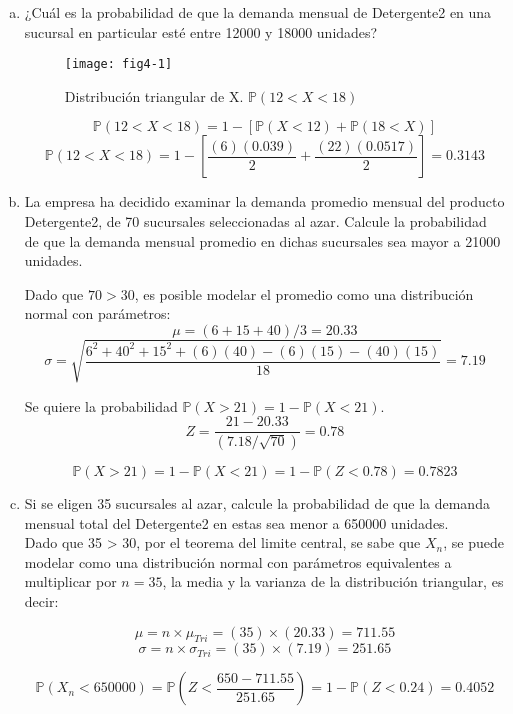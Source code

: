 \documentclass[../main.tex]{subfiles}
\begin{document}
\begin{enumerate}[(a)]

\item ¿Cuál es la probabilidad de que la demanda mensual de Detergente2
en una sucursal en particular esté entre 12000 y 18000 unidades?

\begin{figure}[h]
\centering
\texttt{[image: fig4-1]}
\label{fig:img1}
\caption{Distribución triangular de X. $\mathbb{P}(12 < X < 18)$}
\end{figure}

$$\mathbb{P}(12 < X < 18) = 1 - [\mathbb{P}(X < 12) + \mathbb{P}(18 < X)]$$
$$\mathbb{P}(12 < X < 18) = 1 - \left[\frac{(6)(0.039)}{2} + \frac{(22)(0.0517)}{2}\right] = 0.3143$$

\item La empresa ha decidido examinar la demanda promedio mensual del
producto Detergente2, de 70 sucursales seleccionadas al azar. Calcule la
probabilidad de que la demanda mensual promedio en dichas sucursales sea
mayor a 21000 unidades.

Dado que $70 > 30$, es posible modelar el promedio como una distribución normal con parámetros: 
$$\mu = (6 + 15 + 40) / 3 = 20.33$$
$$\sigma = \sqrt{\frac{6^2+40^2+15^2+(6)(40)-(6)(15)-(40)(15)}{18}} = 7.19$$

Se quiere la probabilidad $\mathbb{P}(X > 21) = 1 - \mathbb{P}(X < 21)$. \\
$$Z = \frac{21-20.33}{(7.18 / \sqrt{70})} = 0.78$$

$$\mathbb{P}(X > 21) = 1 - \mathbb{P}(X < 21) = 1 - \mathbb{P}(Z < 0.78) = 0.7823$$

\pagebreak

\item Si se eligen 35 sucursales al azar, calcule la probabilidad de que la
demanda mensual total del Detergente2 en estas sea menor a 650000 unidades.\\

Dado que 35 > 30, por el teorema del limite central, se sabe que $X_{n}$, se puede modelar como una distribución normal con parámetros equivalentes a multiplicar por $n = 35$, la media y la varianza de la distribución triangular, es decir:

$$\mu = n \times \mu_{Tri} = (35) \times (20.33) = 711.55$$
$$\sigma = n \times \sigma_{Tri} = (35) \times (7.19) = 251.65$$

$$\mathbb{P}(X_{n} < 650000) = \mathbb{P}\left(Z < \frac{650-711.55}{251.65}\right) = 1 - \mathbb{P}(Z < 0.24) = 0.4052$$


\end{enumerate}
\end{document}
